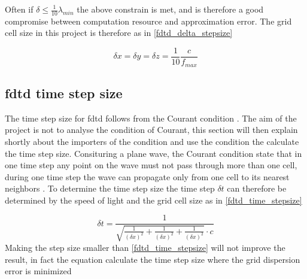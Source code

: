Often if $ \delta \leq \frac{1}{10}\lambda_{min}$ the above constrain is met, and is therefore a good compromise between computation resource and approximation error. The grid cell size in this project is therefore as in \autoref{fdtd_delta_stepsize}

\begin{equation}\label{fdtd_delta_stepsize}
\delta x = \delta y = \delta z = \frac{1}{10} \frac{c}{f_{max}}
\end{equation}

    \startexplain
    \stopexplain
    
    
\subsection{\gls{fdtd} time step size}    
The time step size for \gls{fdtd} follows from the Courant condition \citep{Kunz1993}. The aim of the project is not to analyse the condition of Courant, this section will then explain shortly about the importers of the condition and use the condition the calculate the time step size. Consituring a plane wave, the Courant condition state that in one time step any point on the wave must not pass through more than one cell, during one time step the wave can propagate only from one cell to its nearest neighbors \citep{Kunz1993}. To determine the time step size the time step $\delta t $ can therefore be determined by the speed of light and the grid cell size as in \autoref{fdtd_time_stepsize}



\begin{equation}\label{fdtd_time_stepsize}
\delta t = \frac{1}{\sqrt{\frac{1}{(\delta x)^2}+\frac{1}{(\delta x)^2}+\frac{1}{(\delta x)^2} }\cdot c}
\end{equation}
        \startexplain
    \stopexplain
Making the step size smaller than \autoref{fdtd_time_stepsize} will not improve the result, in fact the equation calculate the time step size where the grid dispersion error is minimized \citep{Kunz1993}
    
